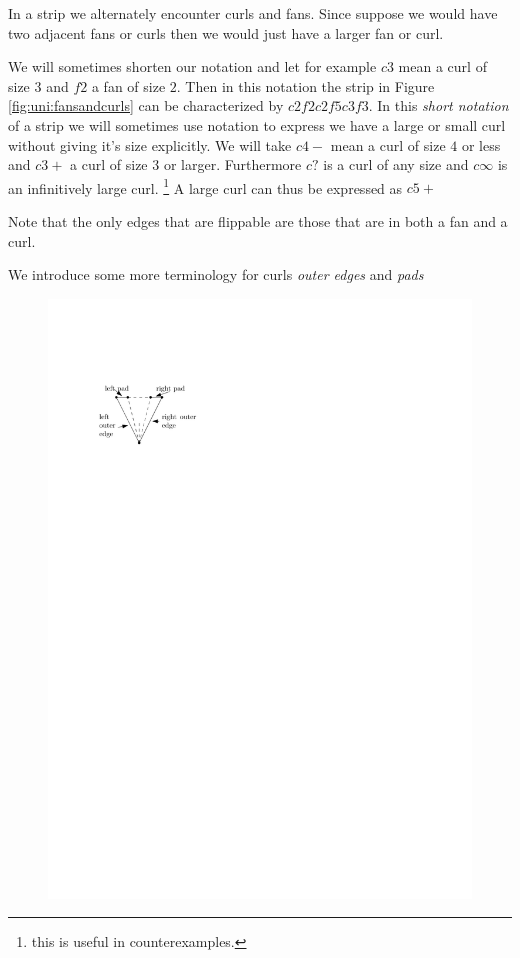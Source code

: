 In a strip we alternately encounter curls and fans. Since suppose we would have two adjacent fans or curls then we would just have a larger fan or curl.

We will sometimes shorten our notation and let for example $c3$ mean a curl of size $3$ and $f2$ a fan of size $2$. Then in this notation the strip in Figure \ref{fig:uni:fansandcurls} can be characterized by $c2 f2 c2 f5 c3 f3$. In this \emph{short notation} of a strip we will sometimes use notation to express we have a large  or small curl without giving it's size explicitly. We will take $c4-$ mean a curl of size $4$ or less and $c3+$ a curl of size $3$ or larger.  Furthermore $c?$ is a curl of any size and $c\infty$ is an infinitively large curl.
\footnote{this is useful in counterexamples.} A large curl can thus be expressed as $c5+$

Note that the only edges that are flippable are those that are in both a fan and a curl.


We introduce some more terminology for curls \emph{outer edges} and \emph{pads}
\begin{figure}[h]
  \centering
  \includegraphics[scale=1]{unifiedAlgo/img/curlterms}
  \caption{}
  \label{fig:}
\end{figure}


